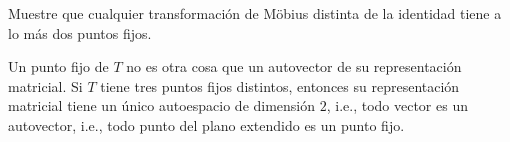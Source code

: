 \begin{exercise}
Muestre que cualquier transformación de Möbius distinta de la identidad tiene a lo más dos puntos fijos.
\end{exercise}

\begin{solution}
Un punto fijo de $T$ no es otra cosa que un autovector de su representación matricial. Si $T$ tiene tres puntos fijos distintos, entonces su representación matricial tiene un único autoespacio de dimensión $2$, i.e., todo vector es un autovector, i.e., todo punto del plano extendido es un punto fijo.
\end{solution}
